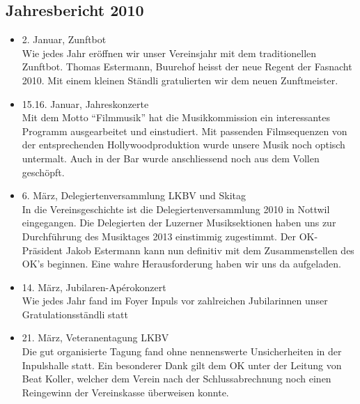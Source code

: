 \subsection{Jahresbericht 2010}
\begin{history}


    \begin{itemize}

        \item[]2. Januar, Zunftbot\\
        Wie jedes Jahr eröffnen wir unser Vereinsjahr mit dem traditionellen
        Zunftbot. Thomas Estermann, Buurehof heisst der neue Regent der Fasnacht
        2010. Mit einem kleinen Ständli gratulierten wir dem neuen Zunftmeister.

        \item[]15.16. Januar, Jahreskonzerte\\
        Mit dem Motto \enquote{Filmmusik} hat die Musikkommission ein
        interessantes Programm ausgearbeitet und einstudiert. Mit passenden
        Filmsequenzen von der entsprechenden Hollywoodproduktion wurde unsere
        Musik noch optisch untermalt. Auch in der Bar wurde anschliessend noch
        aus dem Vollen geschöpft.

        \item[]6. März, Delegiertenversammlung LKBV und Skitag\\
        In die Vereinsgeschichte ist die Delegiertenversammlung 2010 in Nottwil
        eingegangen. Die Delegierten der Luzerner Musiksektionen haben uns zur
        Durchführung des Musiktages 2013 einstimmig zugestimmt. Der OK-Präsident
        Jakob Estermann kann nun definitiv mit dem Zusammenstellen des OK's
        beginnen. Eine wahre Herausforderung haben wir uns da aufgeladen.

        \item[]14. März, Jubilaren-Apérokonzert\\
        Wie jedes Jahr fand im Foyer Inpuls vor zahlreichen Jubilarinnen unser
        Gratulationsständli statt

        \item[]21. März, Veteranentagung LKBV\\
        Die gut organisierte Tagung fand ohne nennenswerte Unsicherheiten in der
        Inpulshalle statt. Ein besonderer Dank gilt dem OK unter der Leitung von
        Beat Koller, welcher dem Verein nach der Schlussabrechnung noch einen
        Reingewinn der Vereinskasse überweisen konnte.


\end{itemize}
\end{history}
